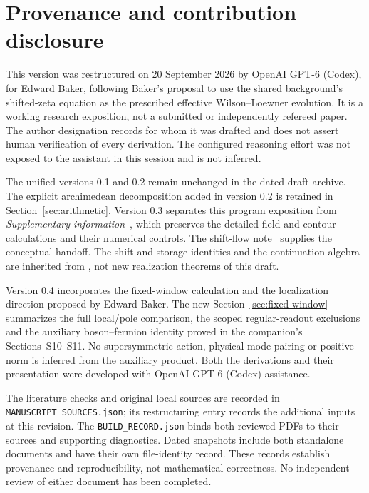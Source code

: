 \section{Provenance and contribution disclosure}\label{app:provenance}

This version was restructured on 20 September 2026 by OpenAI GPT-6
(Codex), for Edward Baker, following Baker's proposal to use the
shared background's shifted-zeta equation as the prescribed
effective Wilson--Loewner evolution. It is a working research
exposition, not a submitted or independently refereed paper.
The author designation records for whom it was drafted and does
not assert human verification of every derivation. The configured
reasoning effort was not exposed to the assistant in this session
and is not inferred.

The unified versions 0.1 and 0.2 remain unchanged in the dated
draft archive. The explicit archimedean decomposition added in
version 0.2 is retained in Section~\ref{sec:arithmetic}.
Version 0.3 separates this program exposition from
\emph{Supplementary information}~\cite{Supplement}, which preserves
the detailed field and contour calculations and their numerical
controls. The shift-flow note~\cite{ShiftFlowNote} supplies the
conceptual handoff. The shift and storage identities and the
continuation algebra are inherited from
\cite{SharedBackground,AdaptivePath,CumulativePath}, not new
realization theorems of this draft.

Version 0.4 incorporates the fixed-window calculation and the
localization direction proposed by Edward Baker. The new
Section~\ref{sec:fixed-window} summarizes the full local/pole
comparison, the scoped regular-readout exclusions and the auxiliary
boson--fermion identity proved in the companion's Sections~S10--S11.
No supersymmetric action, physical mode pairing or positive norm is
inferred from the auxiliary product. Both the derivations and their
presentation were developed with OpenAI GPT-6 (Codex) assistance.

The literature checks and original local sources are recorded in
\nolinkurl{MANUSCRIPT_SOURCES.json}; its restructuring entry records
the additional inputs at this revision. The
\nolinkurl{BUILD_RECORD.json} binds both reviewed PDFs to their
sources and supporting diagnostics. Dated snapshots include both
standalone documents and have their own file-identity record.
These records establish provenance and reproducibility, not
mathematical correctness. No independent review of either document
has been completed.

